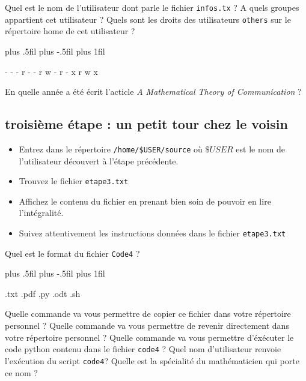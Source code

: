 \documentclass[a4paper,10pt,addpoints]{exam}
\newenvironment{oneparcheckboxescentering}{
	\begingroup
	\leftskip=80mm plus .5fil%
	\rightskip=0mm plus -.5fil%
	\parfillskip=0mm plus 1fil\relax
	\begin{oneparcheckboxes}
	}{
	\end{oneparcheckboxes}
	\par
	\endgroup
}
\begin{document}
\begin{questions}
		\setlength\answerlinelength{8cm}
		\question [2] Quel est le nom de l'utilisateur dont parle le fichier \verb|infos.tx| ?
		\answerline
		\question [1]A quels groupes appartient cet utilisateur ?
		\answerline
		\question [1] Quels sont les droits des utilisateurs \verb|others| sur le répertoire home de cet utilisateur ?
		\newline
		\checkboxchar{$\Box$}
		
		\begin{oneparcheckboxescentering}
			\choice - - - \choice r - -  \choice r w - \choice r - x \choice r w x 
		\end{oneparcheckboxescentering}
	
		\bonusquestion [1] En quelle année a été écrit l'acticle \textit{A Mathematical Theory of Communication} ?
		\answerline

\subsection{troisième étape : un petit tour chez le voisin}
\begin{itemize}[label=$\leadsto$, font=\LARGE \color{blue}]
	\item Entrez dans le répertoire \verb|/home/$USER/source| où $\$USER$ est le nom de l'utilisateur découvert à l'étape précédente.
	\item Trouvez le fichier \verb|etape3.txt|
	\item Affichez le contenu du fichier en prenant bien soin de pouvoir en lire l'intégralité.
	\item Suivez attentivement les instructions données dans le fichier \verb|etape3.txt|
\end{itemize}
\question [1]Quel est le format du fichier \verb|Code4| ?
\newline

\begin{oneparcheckboxescentering}
	\choice .txt \choice .pdf  \choice .py \choice .odt \choice .sh 
\end{oneparcheckboxescentering}
\question [1] Quelle commande va vous permettre de copier ce fichier dans votre répertoire personnel ?
\answerline
\question[\half] Quelle commande va vous permettre de revenir directement dans votre répertoire personnel ?
\answerline
\question[\half] Quelle commande va vous permettre d'éxécuter le code python contenu dans le fichier \verb|code4| ?
\answerline
\question [1] Quel nom d'utilisateur renvoie l'exécution du script \verb|code4|?
\answerline
\bonusquestion [1] Quelle est la spécialité du mathématicien qui porte ce nom ?
\newline


\end{questions}
\end{document}
